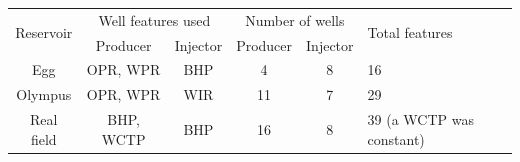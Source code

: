 \begin{tabular}{c cc cc l}
\toprule
    \multirow{2}{*}{Reservoir} & 
    \multicolumn{2}{c}{Well features used} & 
    \multicolumn{2}{c}{Number of wells} & 
    \multirow{2}{*}{Total features} \\
    & Producer & Injector & Producer & Injector & \\
\midrule
    Egg        & OPR, WPR & BHP & 4 & 8 & 16 \\
    Olympus    & OPR, WPR & WIR & 11 & 7 & 29 \\
    Real field & BHP, WCTP & BHP & 16 & 8 & 39 (a WCTP was constant) \\
\bottomrule
\end{tabular}